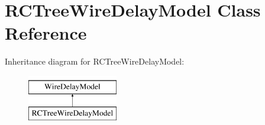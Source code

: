 \hypertarget{classRCTreeWireDelayModel}{\section{R\-C\-Tree\-Wire\-Delay\-Model Class Reference}
\label{classRCTreeWireDelayModel}
}
Inheritance diagram for R\-C\-Tree\-Wire\-Delay\-Model\-:\begin{figure}[H]
\begin{center}
\leavevmode
\includegraphics[height=2.000000cm]{classRCTreeWireDelayModel}
\end{center}
\end{figure}
